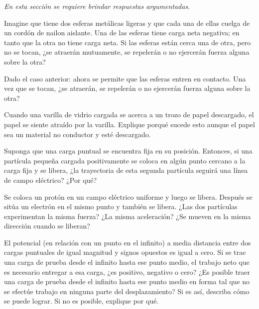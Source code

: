\textit{En esta sección se requiere brindar respuestas argumentadas.}
\setcounter{figure}{0}
%
\begin{Exercise}
    Imagine que tiene dos esferas metálicas ligeras y que cada una de ellas cuelga de un cordón de nailon aislante. Una de las esferas tiene carga neta negativa; en tanto que la otra no tiene carga neta. Si las esferas están cerca una de otra, pero no se tocan, ¿se atraerán mutuamente, se repelerán o no ejercerán fuerza alguna sobre la otra?
\end{Exercise}
%
\begin{Exercise}
Dado el caso anterior: ahora se permite que las esferas entren en contacto. Una vez que se tocan, ¿se atraerán, se repelerán o no ejercerán fuerza alguna sobre la otra?
\end{Exercise}
%
\begin{Exercise}
    Cuando una varilla de vidrio cargada se acerca a un trozo de papel descargado, el papel se siente atraído por la varilla. Explique porqué sucede esto aunque el papel sea un material no conductor y esté descargado.
\end{Exercise}
%
\begin{Exercise}
    Suponga que una carga puntual se encuentra fija en su posición. Entonces, si una partícula pequeña cargada positivamente se coloca en algún punto cercano a la carga fija y se libera, ¿la trayectoria de esta segunda partícula seguirá una línea de campo eléctrico? ¿Por qué?
\end{Exercise}
%
\begin{Exercise}
    Se coloca un protón en un campo eléctrico uniforme y luego se libera. Después se sitúa un electrón en el mismo punto y también se libera. ¿Las dos partículas experimentan la misma fuerza? ¿La misma aceleración? ¿Se mueven en la misma dirección cuando se liberan?
\end{Exercise}
%
\begin{Exercise}
    El potencial (en relación con un punto en el infinito) a media distancia entre dos cargas puntuales de igual magnitud y signos opuestos es igual a cero. Si se trae una carga de prueba desde el infinito hasta ese punto medio, el trabajo neto que es necesario entregar a esa carga, ¿es positivo, negativo o cero? ¿Es posible traer una carga de prueba desde el infinito hasta ese punto medio en forma tal que no se efectúe trabajo en ninguna parte del desplazamiento? Si es así, describa cómo se puede lograr. Si no es posible, explique por qué.
\end{Exercise}
